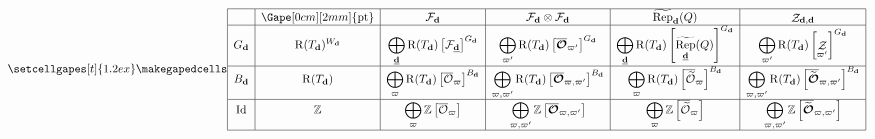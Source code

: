 \documentclass[border={7pt 0pt 160pt 0pt},varwidth]{standalone}
\DeclareMathOperator{\Id}{\operatorname{Id}}
\DeclareMathOperator{\RRep}{\widetilde{\operatorname{Rep}}}
\DeclareMathOperator{\pt}{\operatorname{pt}}
\DeclareMathOperator{\Rpt}{\operatorname{R}}
\DeclareMathOperator{\St}{\mathcal{Z}}
\newcommand{\dimvec}[1]{\mathbf{#1}}
\newcommand{\ftdimvec}[1]{\underline{\dimvec{#1}}}
\newcommand{\ww}{\varpi}
\newcommand{\Wd}{W_{\dimvec{d}}}
\newcommand{\Ocell}{\mathcal{O}}
\newcommand{\OOcell}{\boldsymbol{\mathcal{O}}}
\newcommand{\preimage}[1]{\widetilde{#1}}
\begin{document}
\begin{table}[]
\[
 \setcellgapes[t]{1.2ex}\makegapedcells
\centering
\begin{array}{|c|c|c|c|c|c|}
\hline
      & \Gape[0cm][2mm]{\pt}         & \mathcal{F}_{\dimvec{d}}                                                    & \mathcal{F}_{\dimvec{d}} \otimes \mathcal{F}_{\dimvec{d}}                &\RRep_{\dimvec{d}}(Q)&   \St_{\dimvec{d},\dimvec{d}}                      \\
       \hline
G_{\dimvec{d}} & \Rpt(T_{\dimvec{d}})^{\Wd} & \displaystyle\bigoplus_{\ftdimvec{d}}\Rpt(T_{\dimvec{d}})  \left[ \mathcal{F}_{\ftdimvec{d}} \right]^{G_{\dimvec{d}}}                                                      & \displaystyle\bigoplus_{\ww'} \Rpt(T_{\dimvec{d}})  \left[ \overline{\OOcell}_{\ww'} \right]^{G_{\dimvec{d}}}
& \displaystyle\bigoplus_{\ftdimvec{d}}\Rpt(T_{\dimvec{d}})    \left[ \RRep_{\ftdimvec{d}}(Q) \right]^{G_{\dimvec{d}}}                                                                             & \displaystyle\bigoplus_{\ww'} \Rpt(T_{\dimvec{d}})  \left[ \St_{\ww'} \right]^{G_{\dimvec{d}}} \\ \hline
{B_{\dimvec{d}}}     & \Rpt(T_{\dimvec{d}})     & \displaystyle\bigoplus_{\ww} \Rpt(T_{\dimvec{d}}) \left[ \overline{\Ocell}_{\ww} \right]^{B_{\dimvec{d}}}  & \displaystyle\bigoplus_{\ww,\ww'} \Rpt(T_{\dimvec{d}}) \left[ \overline{\OOcell}_{\ww,\ww'} \right]^{B_{\dimvec{d}}}
& \displaystyle\bigoplus_{\ww} \Rpt(T_{\dimvec{d}}) \left[ \overline{\preimage{\Ocell}}_{\ww} \right]^{B_{\dimvec{d}}}  & \displaystyle\bigoplus_{\ww,\ww'} \Rpt(T_{\dimvec{d}}) \left[ \overline{\preimage{\OOcell}}_{\ww,\ww'} \right]^{B_{\dimvec{d}}}    \\ \hline
\Id   & \mathbb{Z}  & \displaystyle\bigoplus_{\ww} \mathbb{Z} \left[ \overline{\Ocell}_{\ww} \right] & \displaystyle\bigoplus_{\ww,\ww'} \mathbb{Z} \left[ \overline{\OOcell}_{\ww,\ww'} \right]
& \displaystyle\bigoplus_{\ww} \mathbb{Z} \left[ \overline{\preimage{\Ocell}}_{\ww} \right] & \displaystyle\bigoplus_{\ww,\ww'} \mathbb{Z} \left[ \overline{\preimage{\OOcell}}_{\ww,\ww'} \right]   \\ \hline
\end{array}
\]
\end{table}
\end{document}
